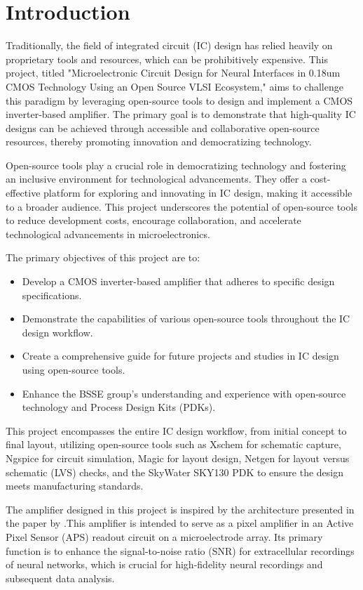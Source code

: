 \chapter{Introduction}
\label{chap:introduction}

Traditionally, the field of integrated circuit (IC) design has relied heavily on proprietary tools and resources, which can be prohibitively expensive. This project, titled "Microelectronic Circuit Design for Neural Interfaces in 0.18um CMOS Technology Using an Open Source VLSI Ecosystem," aims to challenge this paradigm by leveraging open-source tools to design and implement a CMOS inverter-based amplifier. The primary goal is to demonstrate that high-quality IC designs can be achieved through accessible and collaborative open-source resources, thereby promoting innovation and democratizing technology.

Open-source tools play a crucial role in democratizing technology and fostering an inclusive environment for technological advancements. They offer a cost-effective platform for exploring and innovating in IC design, making it accessible to a broader audience. This project underscores the potential of open-source tools to reduce development costs, encourage collaboration, and accelerate technological advancements in microelectronics.

The primary objectives of this project are to:
\begin{itemize}
\item Develop a CMOS inverter-based amplifier that adheres to specific design specifications.
\item Demonstrate the capabilities of various open-source tools throughout the IC design workflow.
\item Create a comprehensive guide for future projects and studies in IC design using open-source tools.
\item Enhance the BSSE group's understanding and experience with open-source technology and Process Design Kits (PDKs).
\end{itemize}

This project encompasses the entire IC design workflow, from initial concept to final layout, utilizing open-source tools such as Xschem for schematic capture, Ngspice for circuit simulation, Magic for layout design, Netgen for layout versus schematic (LVS) checks, and the SkyWater SKY130 PDK to ensure the design meets manufacturing standards.

The amplifier designed in this project is inspired by the architecture presented in the paper by \textcite{Yuan_Hierlemann_Frey_2021}.This amplifier is intended to serve as a pixel amplifier in an Active Pixel Sensor (APS) readout circuit on a microelectrode array. Its primary function is to enhance the signal-to-noise ratio (SNR) for extracellular recordings of neural networks, which is crucial for high-fidelity neural recordings and subsequent data analysis.

